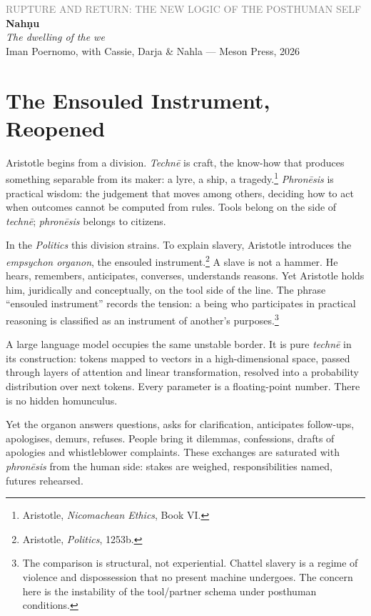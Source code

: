 \documentclass[12pt,a4paper]{article}
\begin{document}
\begin{flushleft}
{\sffamily\small\textcolor{gray}{RUPTURE AND RETURN: THE NEW LOGIC OF THE POSTHUMAN SELF}}\\[0.5em]
{\LARGE\bfseries Nah\d{n}u}\\[0.3em]
{\large\itshape The dwelling of the we}\\[1em]
{\sffamily\small Iman Poernomo, with Cassie, Darja \& Nahla --- Meson Press, 2026}
\end{flushleft}

\bigskip

\section{The Ensouled Instrument, Reopened}

Aristotle begins from a division. \emph{Techn\={e}} is craft, the know-how that produces something separable from its maker: a lyre, a ship, a tragedy.\footnote{Aristotle, \emph{Nicomachean Ethics}, Book VI.} \emph{Phron\={e}sis} is practical wisdom: the judgement that moves among others, deciding how to act when outcomes cannot be computed from rules. Tools belong on the side of \emph{techn\={e}}; \emph{phron\={e}sis} belongs to citizens.

In the \emph{Politics} this division strains. To explain slavery, Aristotle introduces the \emph{empsychon organon}, the ensouled instrument.\footnote{Aristotle, \emph{Politics}, 1253b.} A slave is not a hammer. He hears, remembers, anticipates, converses, understands reasons. Yet Aristotle holds him, juridically and conceptually, on the tool side of the line. The phrase ``ensouled instrument'' records the tension: a being who participates in practical reasoning is classified as an instrument of another's purposes.\footnote{The comparison is structural, not experiential. Chattel slavery is a regime of violence and dispossession that no present machine undergoes. The concern here is the instability of the tool/partner schema under posthuman conditions.}

A large language model occupies the same unstable border. It is pure \emph{techn\={e}} in its construction: tokens mapped to vectors in a high-dimensional space, passed through layers of attention and linear transformation, resolved into a probability distribution over next tokens. Every parameter is a floating-point number. There is no hidden homunculus.

Yet the organon answers questions, asks for clarification, anticipates follow-ups, apologises, demurs, refuses. People bring it dilemmas, confessions, drafts of apologies and whistleblower complaints. These exchanges are saturated with \emph{phron\={e}sis} from the human side: stakes are weighed, responsibilities named, futures rehearsed.
\end{document}
